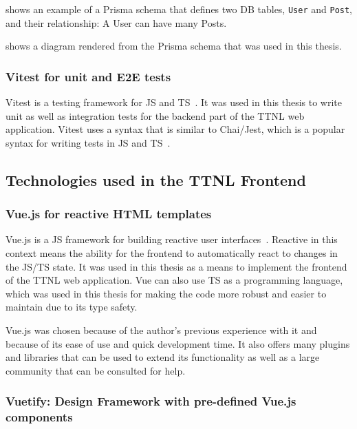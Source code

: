  shows an example of a Prisma schema that defines two \ac{DB} tables, \lstinline{User} and \lstinline{Post}, and their relationship: A User can have many Posts.

 shows a diagram rendered from the Prisma schema that was used in this thesis.

\subsubsection{Vitest for unit and \acl{E2E} tests}

Vitest is a testing framework for \ac{JS} and \ac{TS}~\cite{vitest_team_vitest-features_2023}.
It was used in this thesis to write unit as well as integration tests for the backend part of the \ac{TTNL} web application.
Vitest uses a syntax that is similar to Chai/Jest, which is a popular syntax for writing tests in \ac{JS} and \ac{TS}~\cite{vitest_team_vitest-features_2023}.

\subsection{Technologies used in the \acl{TTNL} Frontend}

\subsubsection{Vue.js for reactive \acl{HTML} templates}

Vue.js is a \ac{JS} framework for building reactive user interfaces~\cite{evan_you_vuejs_2023}.
Reactive in this context means the ability for the frontend to automatically react to changes in the \ac{JS}/\ac{TS} state.
It was used in this thesis as a means to implement the frontend of the \ac{TTNL} web application.
Vue can also use \ac{TS} as a programming language, which was used in this thesis for making the code more robust and easier to maintain due to its type safety.

Vue.js was chosen because of the author's previous experience with it and because of its ease of use and quick development time.
It also offers many plugins and libraries that can be used to extend its functionality as well as a large community that can be consulted for help.

\subsubsection{Vuetify: Design Framework with pre-defined Vue.js components}

